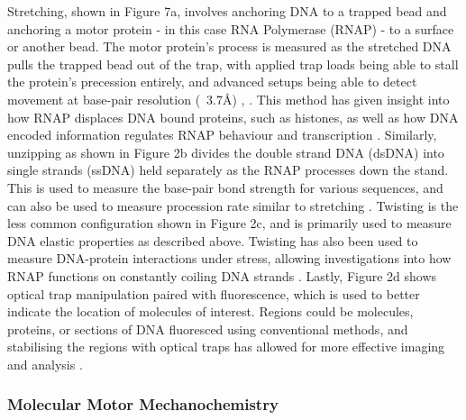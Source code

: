 \documentclass{article}
\begin{document}
Stretching, shown in Figure 7a, involves anchoring DNA to a trapped bead and anchoring a motor protein - in this case RNA Polymerase (RNAP) - to a surface or another bead. The motor protein's process is measured as the stretched DNA pulls the trapped bead out of the trap, with applied trap loads being able to stall the protein's precession entirely, and advanced setups being able to detect movement at base-pair resolution (~3.7Å) \cite{Abbondanzieri2005}, \cite{science.1235441}. This method has given insight into how RNAP displaces DNA bound proteins, such as histones, as well as how DNA encoded information regulates RNAP behaviour and transcription \cite{Abbondanzieri2005}. Similarly, unzipping as shown in Figure 2b divides the double strand DNA (dsDNA) into single strands (ssDNA) held separately as the RNAP processes down the stand. This is used to measure the base-pair bond strength for various sequences, and can also be used to measure procession rate similar to stretching \cite{Bustamante2021}. Twisting is the less common configuration shown in Figure 2c, and is primarily used to measure DNA elastic properties as described above. Twisting has also been used to measure DNA-protein interactions under stress, allowing investigations into how RNAP functions on constantly coiling DNA strands \cite{science.1235441}. Lastly, Figure 2d shows optical trap manipulation paired with fluorescence, which is used to better indicate the location of molecules of interest. Regions could be molecules, proteins, or sections of DNA fluoresced using conventional methods, and stabilising the regions with optical traps has allowed for more effective imaging and analysis \cite{Harada1999-bb}.




\subsubsection*{Molecular Motor Mechanochemistry}
\end{document}
